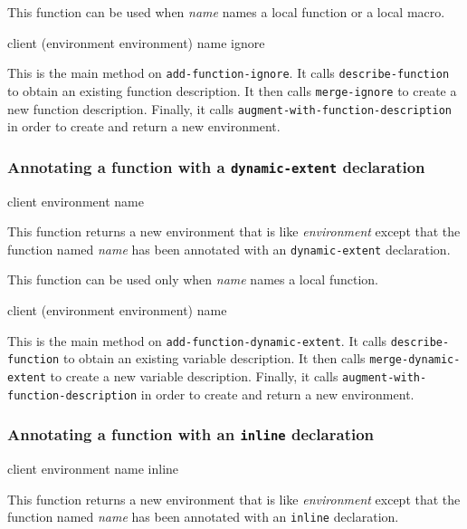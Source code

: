 This function can be used when \textit{name} names a local function or
a local macro.

{\footnotesize
{}
{client
 (environment environment)
 name
 ignore}
}

This is the main method on \texttt{add-function-ignore}.  It calls
\texttt{describe-function} to obtain an existing function description.
It then calls \texttt{merge-ignore} to create a new function
description.  Finally, it calls
\texttt{augment-with-function-description} in order to create and
return a new environment.

\subsubsection{Annotating a function with a \texttt{dynamic-extent} declaration}
\label{sec-annotating-a-function-with-dynamic-extent}

{\footnotesize
{} {client environment name}
}

This function returns a new environment that is like
\textit{environment} except that the function named \textit{name} has
been annotated with an \texttt{dynamic-extent} declaration.

This function can be used only when \textit{name} names a local function.

{\footnotesize
{}
{client
 (environment environment)
 name}
}

This is the main method on \texttt{add-function-dynamic-extent}.  It
calls \texttt{describe-function} to obtain an existing variable
description.  It then calls \texttt{merge-dynamic-extent} to create a new
variable description.  Finally, it calls
\texttt{augment-with-function-description} in order to create and
return a new environment.

\subsubsection{Annotating a function with an \texttt{inline} declaration}
\label{sec-annotating-a-function-with-inline}

{\footnotesize
{} {client environment name inline}
}

This function returns a new environment that is like
\textit{environment} except that the function named \textit{name} has
been annotated with an \texttt{inline} declaration.

